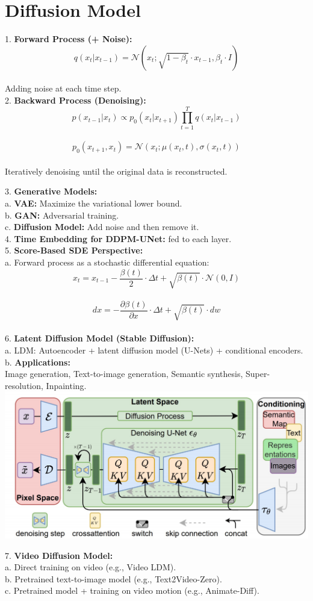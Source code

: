 \section{Diffusion Model}
1. \textbf{Forward Process (+ Noise):} \\
   \[
   q(x_t|x_{t-1}) = \mathcal{N}(x_t; \sqrt{1-\beta_t} \cdot x_{t-1}, \beta_t \cdot I)
   \] \\
   Adding noise at each time step. \\
2. \textbf{Backward Process (Denoising):} \\
   \[
   p(x_{t-1}|x_t) \propto p_0(x_t|x_{t+1}) \prod_{t=1}^T q(x_t|x_{t-1})
   \] \\
   \[
   p_0(x_{t+1}, x_t) = \mathcal{N}(x_t; \mu(x_t, t), \sigma(x_t, t))
   \] \\
   Iteratively denoising until the original data is reconstructed.

3. \textbf{Generative Models:} \\
   a. \textbf{VAE:} Maximize the variational lower bound. \\
   b. \textbf{GAN:} Adversarial training. \\
   c. \textbf{Diffusion Model:} Add noise and then remove it. \\

4. \textbf{Time Embedding for DDPM-UNet:} fed to each layer. \\

5. \textbf{Score-Based SDE Perspective:} \\
   a. Forward process as a stochastic differential equation: \\
      \[
      x_t = x_{t-1} - \frac{\beta(t)}{2} \cdot \Delta t + \sqrt{\beta(t)} \cdot \mathcal{N}(0, I)
      \] \\
      \[
      dx = - \frac{\partial \beta(t)}{\partial x} \cdot \Delta t + \sqrt{\beta(t)} \cdot dw
      \] \\

6. \textbf{Latent Diffusion Model (Stable Diffusion):} \\
   a. LDM: Autoencoder + latent diffusion model (U-Nets) + conditional encoders. \\
   b. \textbf{Applications:} \\
      Image generation, Text-to-image generation, Semantic synthesis, Super-resolution, Inpainting. \\

    \includegraphics[width=1\linewidth]{images/latent-diff.png}
    
7. \textbf{Video Diffusion Model:} \\
   a. Direct training on video (e.g., Video LDM). \\
   b. Pretrained text-to-image model (e.g., Text2Video-Zero). \\
   c. Pretrained model + training on video motion (e.g., Animate-Diff). \\